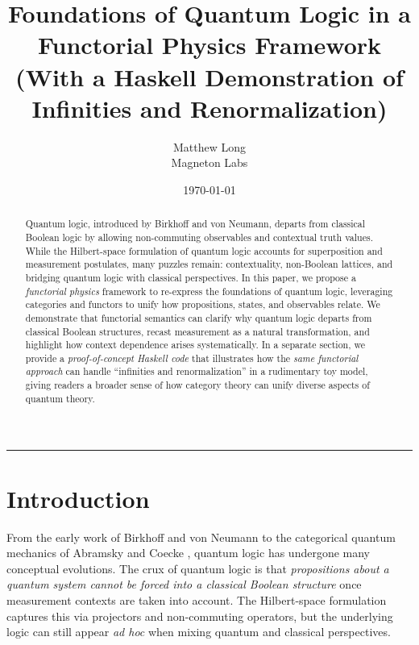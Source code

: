 \documentclass[12pt]{article}
\title{\bf Foundations of Quantum Logic in a Functorial Physics Framework \\
\large (With a Haskell Demonstration of Infinities and Renormalization)}
\author{Matthew Long \\
Magneton Labs}
\date{\today}
\begin{document}
\maketitle

\begin{abstract}
Quantum logic, introduced by Birkhoff and von Neumann, departs from classical Boolean logic by allowing non-commuting observables and contextual truth values. While the Hilbert-space formulation of quantum logic accounts for superposition and measurement postulates, many puzzles remain: contextuality, non-Boolean lattices, and bridging quantum logic with classical perspectives. In this paper, we propose a \emph{functorial physics} framework to re-express the foundations of quantum logic, leveraging categories and functors to unify how propositions, states, and observables relate. We demonstrate that functorial semantics can clarify why quantum logic departs from classical Boolean structures, recast measurement as a natural transformation, and highlight how context dependence arises systematically. In a separate section, we provide a \emph{proof-of-concept Haskell code} that illustrates how the \emph{same functorial approach} can handle ``infinities and renormalization'' in a rudimentary toy model, giving readers a broader sense of how category theory can unify diverse aspects of quantum theory.
\end{abstract}

\hrule
\vspace{1em}

\section{Introduction}
From the early work of Birkhoff and von Neumann \cite{BirkhoffVonNeumann} to the categorical quantum mechanics of Abramsky and Coecke \cite{AbramskyCoecke}, quantum logic has undergone many conceptual evolutions. The crux of quantum logic is that \emph{propositions about a quantum system cannot be forced into a classical Boolean structure} once measurement contexts are taken into account. The Hilbert-space formulation captures this via projectors and non-commuting operators, but the underlying logic can still appear \emph{ad hoc} when mixing quantum and classical perspectives.
\end{document}
